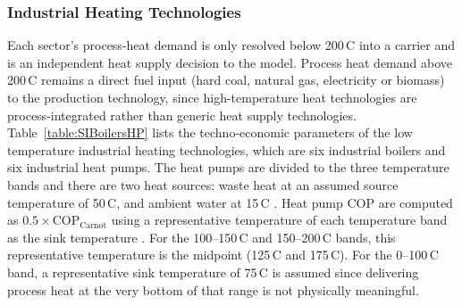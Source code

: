 \begin{figure}[h!]
	\centering
	
	\label{fig:SIIndustryHeat}
\end{figure}

\subsubsection{Industrial Heating Technologies}

Each sector's process-heat demand is only resolved below 200\,\degree C into a carrier and is an independent heat supply decision to the model. Process heat demand above 200\,\degree C remains a direct fuel input (hard coal, natural gas, electricity or biomass) to the production technology, since high-temperature heat technologies are process-integrated rather than generic heat supply technologies. \cite{Madeddu2020} \\

Table~\ref{table:SIBoilersHP} lists the techno-economic parameters of the low temperature industrial heating technologies, which are six industrial boilers and six industrial heat pumps. The heat pumps are divided to the three temperature bands and there are two heat sources: waste heat at an assumed source temperature of 50\,\degree C, and ambient water at 15\,\degree C \cite{Agora_IGE2023, Bever2024}. Heat pump \ac{COP} are computed as $0.5 \times \mathrm{COP}_\mathrm{Carnot}$ using a representative temperature of each temperature band as the sink temperature \cite{Agora_IGE2023}. For the 100--150\,\degree C and 150--200\,\degree C bands, this representative temperature is the midpoint (125\,\degree C and 175\,\degree C). For the 0--100\,\degree C band, a representative sink temperature of 75\,\degree C is assumed since delivering process heat at the very bottom of that range is not physically meaningful. \\

